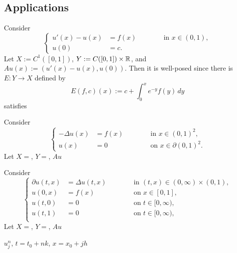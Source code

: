 \documentclass[a4paper]{article}
\begin{document}
\subsection{Applications}
\begin{ex}
Consider
\[\left\{\begin{alignedat}{2}
u'(x)-u(x)&=f(x) &\qquad&\text{ in }x\in(0,1),\\
u(0)&=c. &&
\end{alignedat}\right.\]
Let $X:=C^1([0,1])$, $Y:=C([0,1])\times\mathbb{R}$, and $Au(x):=(u'(x)-u(x),u(0))$.
Then it is well-posed since there is $E:Y\to X$ defined by
\[E(f,c)(x):=c+\int_0^xe^{-y}f(y)\,dy\]
satisfies
\end{ex}

\begin{ex}
Consider
\[\left\{\begin{alignedat}{2}
-\Delta u(x)&=f(x) &\qquad&\text{ in }x\in(0,1)^2,\\
u(x)&=0 &&\text{ on }x\in\partial(0,1)^2.
\end{alignedat}\right.\]
Let $X=$, $Y=$, $Au$
\end{ex}

\begin{ex}
Consider
\[\left\{\begin{alignedat}{2}
\partial u(t,x)&=\Delta u(t,x) &\qquad&\text{ in }(t,x)\in(0,\infty)\times(0,1),\\
u(0,x)&=f(x) &&\text{ on }x\in[0,1],\\
u(t,0)&=0 &&\text{ on }t\in[0,\infty),\\
u(t,1)&=0 &&\text{ on }t\in[0,\infty),\\
\end{alignedat}\right.\]
Let $X=$, $Y=$, $Au$
\end{ex}


$u_j^n$, $t=t_0+nk$, $x=x_0+jh$



\newpage
\end{document}
